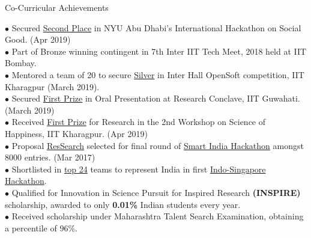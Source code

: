 \documentclass{resume} %
\begin{document}

\begin{rSection}{Co-Curricular Achievements}

$\bullet$ Secured \href{https://sites.nyuad.nyu.edu/hackathon/}{Second Place} in NYU Abu Dhabi's International Hackathon on Social Good. (Apr 2019) \\
$\bullet$ Part of Bronze winning contingent in 7th Inter IIT Tech Meet, 2018 held at IIT Bombay. \\
$\bullet$ Mentored a team of 20 to secure \href{}{Silver} in Inter Hall OpenSoft competition, IIT Kharagpur (March 2019).\\
$\bullet$ Secured \href{https://drive.google.com/file/d/13SDYiXpSi7zXI_bZTb_tj8YukIONf9vn/view?usp=sharing}{First Prize} in Oral Presentation at Research Conclave, IIT Guwahati. (March 2019)\\
$\bullet$ Received \href{https://drive.google.com/file/d/1qDoD5THDmMyWmFPaEpmMYpaEBe0T35ay/view?usp=sharing}{First Prize} for  Research  in the 2nd Workshop on Science of Happiness, IIT Kharagpur. (Apr 2019) \\
$\bullet$ Proposal \href{https://docs.google.com/presentation/d/1ndJbIQCxFEf__I55yOOME-a_UGWDv1KMlukVE2lbDeA/}{ResSearch} selected for final round of \href{https://drive.google.com/open?id=0B5iU6cWw36rOamZLWHZENWdlY0k}{Smart India Hackathon} amongst 8000 entries. (Mar 2017) \\
$\bullet$ Shortlisted in \href{https://www.aicte-india.org/sites/default/files/Shortlisted and waitlisted Teams indo singapore hackathon 2018.pdf}{top 24} teams to represent India in first \href{http://www.ntu.edu.sg/events/events/Pages/Singapore-India-Hackathon-20181002-2080.aspx}{Indo-Singapore Hackathon}.\\
$\bullet$ Qualified for Innovation in Science Pursuit for Inspired Research {\bf \large (INSPIRE)} scholarship, awarded to only \textbf{0.01\%} Indian students every year. \\
$\bullet$ Received scholarship under Maharashtra Talent Search Examination, obtaining a percentile of 96\%.


\end{rSection}
\end{document}
